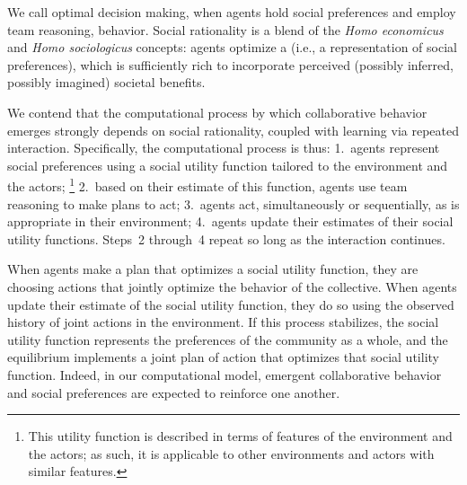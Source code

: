 We call optimal decision making, when agents hold
social preferences and employ team reasoning,  behavior.  Social rationality is a blend of the \emph{Homo
  economicus\/} and \emph{Homo sociologicus\/} concepts: agents
optimize a  (i.e., a representation of
social preferences), which is sufficiently rich to incorporate
perceived (possibly inferred, possibly imagined) societal benefits.

We contend that the computational process by which collaborative
behavior emerges strongly depends on social rationality, coupled with
learning via repeated interaction.
%
Specifically, the computational process is thus:
1.~agents represent social preferences using a social utility function
tailored to the environment and the actors;%
\footnote{This utility function is described in terms of features of the environment and the actors;
as such, it is applicable to other environments and actors with similar features.}
2.~based on their estimate of this function, agents use team reasoning to make plans to act;
3.~agents act, simultaneously or sequentially, as is appropriate in their environment;
4.~agents update their estimates of their social utility functions.
Steps~2 through~4 repeat so long as the interaction continues.

When agents
make a plan that optimizes a social
utility function, they are choosing actions that jointly optimize the
behavior of the collective.
When agents update their estimate of the social utility function, they
do so using the observed history of joint actions in the environment.
If this process stabilizes, the social utility function represents the
preferences of the community as a whole, 
and the equilibrium implements a joint plan of action that optimizes
that social utility function.  Indeed, in our computational model,
emergent collaborative behavior and social preferences are expected to
reinforce one another.


